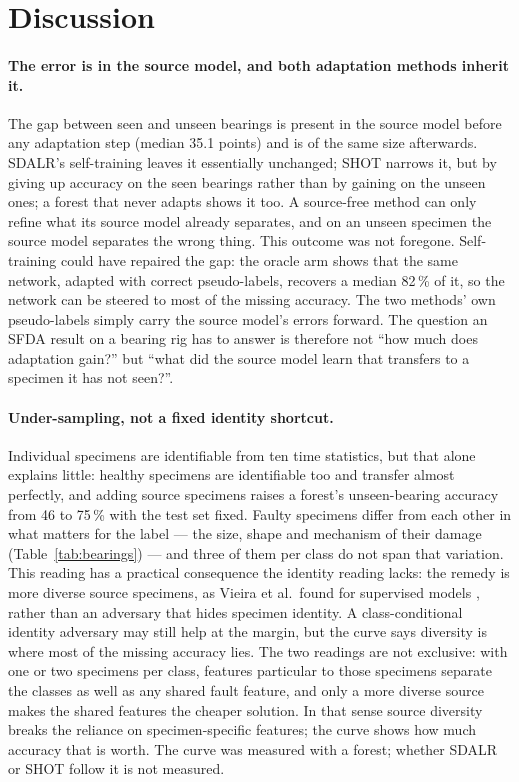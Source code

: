 \section{Discussion}
\label{sec:discussion}

\paragraph{The error is in the source model, and both adaptation methods inherit it.} The gap between seen and unseen
bearings is present in the source model before any adaptation step (median 35.1 points) and is of the same size afterwards.
SDALR's self-training leaves it essentially unchanged; SHOT narrows it, but by giving up accuracy on the seen bearings rather
than by gaining on the unseen ones; a forest that never adapts shows it too. A source-free method can only refine what its
source model already separates, and on an unseen specimen the source model separates the wrong thing. This outcome was not
foregone. Self-training could have repaired the gap: the oracle arm shows that the same network, adapted with correct
pseudo-labels, recovers a median 82\,\% of it, so the network can be steered to most of the missing accuracy. The two methods' own
pseudo-labels simply carry the source model's errors forward. The question an
SFDA result on a bearing rig has to answer is therefore not ``how much does adaptation gain?'' but ``what did the source model
learn that transfers to a specimen it has not seen?''.

\paragraph{Under-sampling, not a fixed identity shortcut.} Individual specimens are identifiable from ten time statistics,
but that alone explains little: healthy specimens are identifiable too and transfer almost perfectly, and adding source
specimens raises a forest's unseen-bearing accuracy from 46 to 75\,\% with the test set fixed. Faulty specimens differ from each other in
what matters for the label --- the size, shape and mechanism of their damage (Table~\ref{tab:bearings}) --- and three of them per
class do not span that variation. This reading has a practical consequence the identity reading lacks: the remedy is more
diverse source specimens, as Vieira et al.\ found for supervised models \cite{vieira2026}, rather than an adversary that hides
specimen identity. A class-conditional identity adversary may still help at the margin, but the curve says diversity is where
most of the missing accuracy lies. The two readings are not exclusive: with one or two specimens per class, features
particular to those specimens separate the classes as well as any shared fault feature, and only a more diverse source makes
the shared features the cheaper solution. In that sense source diversity breaks the reliance on specimen-specific features;
the curve shows how much accuracy that is worth. The curve was measured with a forest; whether SDALR or SHOT follow it is
not measured.

